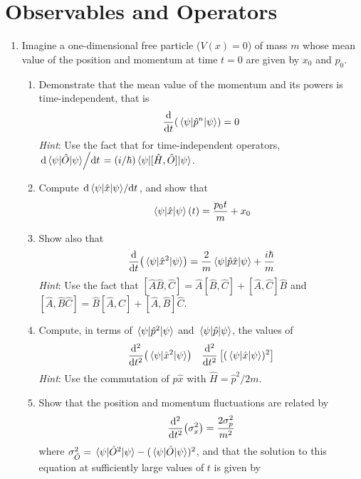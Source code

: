 \documentclass[../psets.tex]{subfiles}
\begin{document}
\section{Observables and Operators}
\begin{enumerate}
    \item {}Imagine a one-dimensional free particle ($V(x)=0$) of mass $m$ whose mean value of the position and momentum at time $t=0$ are given by $x_0$ and $p_0$.
    \begin{enumerate}
        \item Demonstrate that the mean value of the momentum and its powers is time-independent, that is
        \begin{equation}
            \dv{t}(\ev{\hat{p}^n}{\psi}) = 0
        \end{equation}
        \emph{Hint}: Use the fact that for time-independent operators, $\dv*{\ev{\hat{O}}{\psi}}{t}=(i/\hbar)\ev{[\hat{H},\hat{O}]}{\psi}$.
        \item Compute $\dv*{\ev{\hat{x}}{\psi}}{t}$, and show that
        \begin{equation}
            \ev{\hat{x}}{\psi}(t) = \frac{p_0t}{m}+x_0
        \end{equation}
        \item Show also that
        \begin{equation}
            \dv{t}(\ev{\hat{x}^2}{\psi}) = \frac{2}{m}\ev{\hat{p}\hat{x}}{\psi}+\frac{i\hbar}{m}
        \end{equation}
        \emph{Hint}: Use the fact that $[\hat{A}\hat{B},\hat{C}]=\hat{A}[\hat{B},\hat{C}]+[\hat{A},\hat{C}]\hat{B}$ and $[\hat{A},\hat{B}\hat{C}]=\hat{B}[\hat{A},\hat{C}]+[\hat{A},\hat{B}]\hat{C}$.
        \item Compute, in terms of $\ev{\hat{p}^2}{\psi}$ and $\ev{\hat{p}}{\psi}$, the values of
        \begin{align}
            \dv[2]{t}(\ev{\hat{x}^2}{\psi})&&
            \dv[2]{t}\left[ (\ev{\hat{x}}{\psi})^2 \right]
        \end{align}
        \emph{Hint}: Use the commutation of $\hat{p}\hat{x}$ with $\hat{H}=\hat{p}^2/2m$.
        \item Show that the position and momentum fluctuations are related by
        \begin{equation}
            \dv[2]{t}(\sigma_x^2) = \frac{2\sigma_p^2}{m^2}
        \end{equation}
        where $\sigma_{\hat{O}}^2=\ev{\hat{O}^2}{\psi}-(\ev{\hat{O}}{\psi})^2$, and that the solution to this equation at sufficiently large values of $t$ is given by

\end{enumerate}
\end{enumerate}
\end{document}
